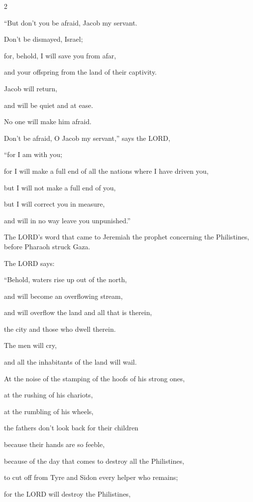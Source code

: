 \begin{multicols}{2}

\myverse{}“But don’t you be afraid, Jacob my servant.

Don’t be dismayed, Israel;

for, behold, I will save you from afar,

and your offspring from the land of their captivity.

Jacob will return,

and will be quiet and at ease.

No one will make him afraid.


\myverse{}Don’t be afraid, O Jacob my servant,” says the LORD,

“for I am with you;

for I will make a full end of all the nations where I have driven you,

but I will not make a full end of you,

but I will correct you in measure,

and will in no way leave you unpunished.”


\mychapter{} \myverse*{}The LORD’s word that came to Jeremiah the prophet concerning the
Philistines, before Pharaoh struck Gaza.


\myverse{}The LORD says:

“Behold, waters rise up out of the north,

and will become an overflowing stream,

and will overflow the land and all that is therein,

the city and those who dwell therein.

The men will cry,

and all the inhabitants of the land will wail.


\myverse{}At the noise of the stamping of the hoofs of his strong ones,

at the rushing of his chariots,

at the rumbling of his wheels,

the fathers don’t look back for their children

because their hands are so feeble,


\myverse{}because of the day that comes to destroy all the Philistines,

to cut off from Tyre and Sidon every helper who remains;

for the LORD will destroy the Philistines,


\end{multicols}
